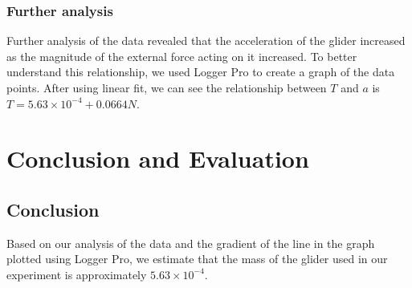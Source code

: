 \documentclass[12pt,a4paper]{article}
\begin{document}
\subsubsection{Further analysis}
Further analysis of the data revealed that the acceleration of the glider increased as the magnitude of the external force acting on it increased. To better understand this relationship, we used Logger Pro to create a graph of the data points. After using linear fit, we can see the relationship between $ T $ and $ a $ is $ T = 5.63 \times 10^ {-4} + 0.0664N$.\par
\section{Conclusion and Evaluation}
\subsection{Conclusion}
Based on our analysis of the data and the gradient of the line in the graph plotted using Logger Pro, we estimate that the mass of the glider used in our experiment is approximately $ 5.63 \times 10^ {-4}  $.\par
\end{document}
